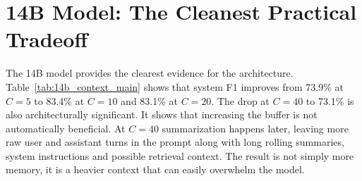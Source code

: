 \section{14B Model: The Cleanest Practical Tradeoff}\label{subsec:results_14b}






The 14B model provides the clearest evidence for the architecture. Table~\ref{tab:14b_context_main} shows that system F1 improves from 73.9\% at $C=5$ to 83.4\% at $C=10$ and 83.1\% at $C=20$. The drop at $C=40$ to 73.1\% is also architecturally significant. It shows that increasing the buffer is not automatically beneficial. At $C=40$ summarization happens later, leaving more raw user and assistant turns in the prompt along with long rolling summaries, system instructions and possible retrieval context. The result is not simply more memory, it is a heavier context that can easily overwhelm the model.


